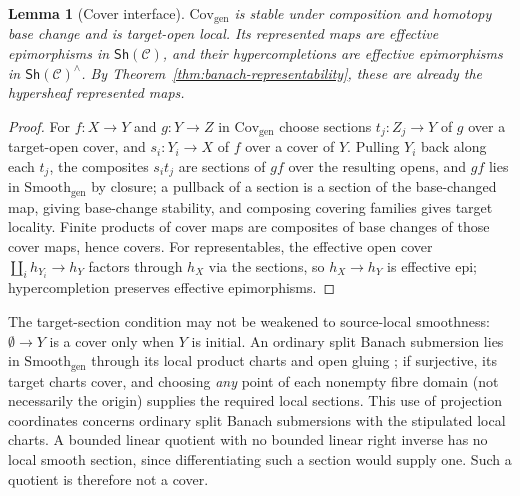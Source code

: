 \documentclass[12pt]{amsart}
\newtheorem{lem}[thm]{Lemma}
\theoremstyle{definition}
\theoremstyle{remark}
\numberwithin{equation}{section}
\newcommand{\Sh}{\mathsf{Sh}}
\begin{document}
\begin{lem}[Cover interface]
\label{lem:banach-cover-interface}
$\mathrm{Cov}_{\mathrm{gen}}$ is stable under composition and
homotopy base change and is target-open local.
Its represented maps are effective epimorphisms in
$\Sh(\mathcal C)$, and their hypercompletions are
effective epimorphisms in $\Sh(\mathcal C)^\wedge$.
By Theorem~\ref{thm:banach-representability}, these
are already the hypersheaf represented maps.
\end{lem}

\begin{proof}
For $f\colon X\to Y$ and $g\colon Y\to Z$ in
$\mathrm{Cov}_{\mathrm{gen}}$ choose sections $t_j\colon Z_j\to Y$ of
$g$ over a target-open cover, and $s_i\colon Y_i\to X$ of $f$ over a
cover of $Y$. Pulling $Y_i$ back along each $t_j$, the composites
$s_i t_j$ are sections of $gf$ over the resulting opens, and $gf$
lies in $\mathrm{Smooth}_{\mathrm{gen}}$ by closure; a pullback of a
section is a section of the base-changed map, giving base-change
stability, and composing covering families gives target locality.
Finite products of cover maps are composites of base changes of
those cover maps, hence covers. For representables, the effective
open cover $\coprod_i h_{Y_i}\to h_Y$ factors through $h_X$ via the
sections, so $h_X\to h_Y$ is effective epi; hypercompletion
preserves effective epimorphisms.
\end{proof}

The target-section condition may not be weakened to source-local
smoothness: $\emptyset\to Y$ is a cover only when $Y$ is initial. An
ordinary split Banach submersion lies in
$\mathrm{Smooth}_{\mathrm{gen}}$ through its local product charts and
open gluing \cite[pp.~28--30]{Schmeding2021}; if surjective, its
target charts cover, and choosing \emph{any} point of each nonempty
fibre domain (not necessarily the origin) supplies the required
local sections. This use of projection coordinates concerns
ordinary split Banach submersions with the stipulated local charts.
A bounded linear quotient with no bounded linear right inverse
has no local smooth section, since differentiating such a section
would supply one. Such a quotient is therefore not a cover.
\end{document}
